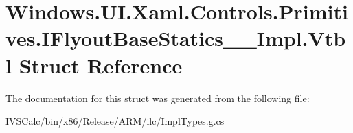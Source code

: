 \hypertarget{struct_windows_1_1_u_i_1_1_xaml_1_1_controls_1_1_primitives_1_1_i_flyout_base_statics_____impl_1_1_vtbl}{}\section{Windows.\+U\+I.\+Xaml.\+Controls.\+Primitives.\+I\+Flyout\+Base\+Statics\+\_\+\+\_\+\+Impl.\+Vtbl Struct Reference}
\label{struct_windows_1_1_u_i_1_1_xaml_1_1_controls_1_1_primitives_1_1_i_flyout_base_statics_____impl_1_1_vtbl}


The documentation for this struct was generated from the following file\+:\begin{DoxyCompactItemize}
\item 
I\+V\+S\+Calc/bin/x86/\+Release/\+A\+R\+M/ilc/Impl\+Types.\+g.\+cs\end{DoxyCompactItemize}
